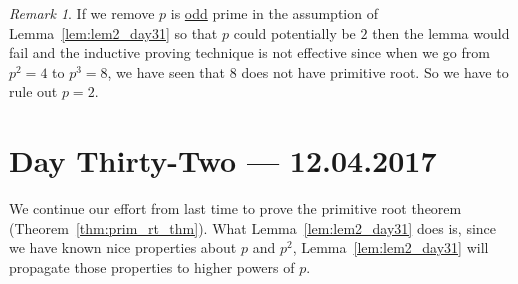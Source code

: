 \documentclass{amsbook}
\theoremstyle{plain}
\theoremstyle{definition}
\theoremstyle{remark}
\newtheorem{remark}[theorem]{Remark}
\numberwithin{equation}{chapter}
\numberwithin{figure}{chapter}
\begin{document}
\begin{remark}
  If we remove $p$ is \underline{odd} prime in the assumption of Lemma~\ref{lem:lem2_day31} so that $p$ could potentially be $2$ then the lemma would fail and the inductive proving technique is not effective since when we go from $p^2 = 4$ to $p^3 = 8$, we have seen that $8$ does not have primitive root. So we have to rule out $p = 2$.  
\end{remark}
\chapter[Lecture Thirty-Two]{Day Thirty-Two \hfill {\footnotesize \rm --- 12.04.2017}}

We continue our effort from last time to prove the primitive root theorem (Theorem~\ref{thm:prim_rt_thm}). What Lemma~\ref{lem:lem2_day31} does is, since we have known nice properties about $p$ and $p^2$, Lemma~\ref{lem:lem2_day31} will propagate those properties to higher powers of $p$.
\end{document}
